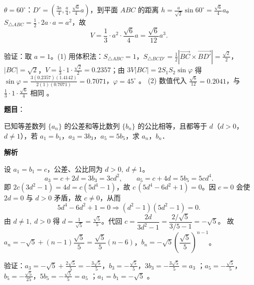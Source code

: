 \begin{answer}

$\theta=60^\circ$：$D'=\left(\frac{3a}{4},\frac a4,\frac{\sqrt6}{4}a\right)$，到平面 $ABC$ 的距离 $h=\frac{a}{\sqrt2}\sin60^\circ=\frac{\sqrt6}{4}a$。
$S_{\triangle ABC}=\frac12\cdot2a\cdot a=a^2$，故
\nopagebreak[4]
\[V=\frac13\cdot a^2\cdot\frac{\sqrt6}{4}a=\frac{\sqrt6}{12}a^3 .\]

验证：取 $a=1$。(1) 用体积法：$S_{\triangle ABC}=1$，$S_{\triangle BCD'}=\frac12|\overrightarrow{BC}\times\overrightarrow{BD'}|=\frac{\sqrt2}{2}$，$|BC|=\sqrt2$，$V=\frac13\cdot1\cdot\frac{\sqrt2}{2}=0.2357$；由 $3V|BC|=2S_1S_2\sin\varphi$ 得 $\sin\varphi=\frac{3(0.2357)(1.4142)}{2(1)(0.7071)}=0.7071$，$\varphi=45^\circ$ 。
(2) 数值代入 $\frac{\sqrt6}{12}=0.2041$，与 $\frac13\cdot1\cdot\frac{\sqrt6}{4}$ 相同 。



\end{answer}
\begin{answer}

\textbf{题目}：

已知等差数列 $\{a_n\}$ 的公差和等比数列 $\{b_n\}$ 的公比相等，且都等于 $d$（$d > 0$，$d \neq 1$），若 $a_1 = b_1$，$a_3 = 3b_3$，$a_5 = 5b_5$，求 $a_n$，$b_n$．

\textbf{解析}

设 $a_1=b_1=c$，公差、公比同为 $d>0,\ d\ne1$。
\nopagebreak[4]
\[a_3=c+2d=3b_3=3cd^2,\qquad a_5=c+4d=5b_5=5cd^4 .\]
即 $2c(3d^2-1)=4d=c(5d^4-1)$，故 $c\,(5d^4-6d^2+1)=0$。因 $c=0$ 会使 $2d=0$ 与 $d>0$ 矛盾，故 $c\ne0$，从而
\nopagebreak[4]
\[5d^4-6d^2+1=0\Rightarrow(d^2-1)(5d^2-1)=0 .\]
由 $d\ne1,\ d>0$ 得 $d=\frac{1}{\sqrt5}=\frac{\sqrt5}{5}$。代回 $c=\dfrac{2d}{3d^2-1}=\dfrac{2/\sqrt5}{3/5-1}=-\sqrt5$。
故 $a_n=-\sqrt5+(n-1)\dfrac{\sqrt5}{5}=\dfrac{\sqrt5}{5}(n-6)$，$b_n=-\sqrt5\left(\dfrac{\sqrt5}{5}\right)^{n-1}$。

验证：$a_3=-\sqrt5+\frac{2\sqrt5}{5}=-\frac{3\sqrt5}{5}$，$b_3=-\frac{\sqrt5}{5}$，$3b_3=-\frac{3\sqrt5}{5}=a_3$ ；$a_5=-\frac{\sqrt5}{5}$，$b_5=-\frac{\sqrt5}{25}$，$5b_5=-\frac{\sqrt5}{5}=a_5$ ；$a_1=b_1=-\sqrt5$ 。


\end{answer}
